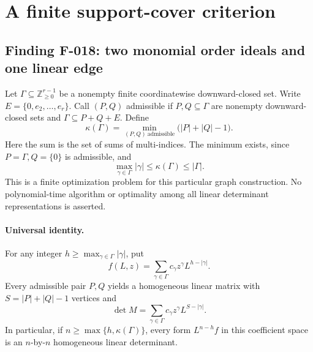 \section{A finite support-cover criterion}

\subsection*{Finding F-018: two monomial order ideals and one linear edge}
Let \(\Gamma\subseteq\mathbb Z_{\geq0}^{r-1}\) be a
nonempty finite coordinatewise downward-closed set. Write
\(E=\{0,e_2,\ldots,e_r\}\). Call \((P,Q)\) admissible
if \(P,Q\subseteq\Gamma\) are nonempty downward-closed
sets and \(\Gamma\subseteq P+Q+E\). Define
\begin{equation}\label{eq:F018kappa}
 \kappa(\Gamma)=\min_{(P,Q)\ \mathrm{admissible}}
                                      \bigl(|P|+|Q|-1\bigr).
\end{equation}
Here the sum is the set of sums of multi-indices. The minimum
exists, since \(P=\Gamma,Q=\{0\}\) is admissible, and
\[
                 \max_{\gamma\in\Gamma}|\gamma|
                         \leq\kappa(\Gamma)\leq|\Gamma|.
\]
This is a finite optimization problem for this particular
graph construction. No polynomial-time algorithm or optimality
among all linear determinant representations is asserted.

\paragraph{Universal identity.}
For any integer \(h\geq\max_{\gamma\in\Gamma}|\gamma|\),
put
\[
               f(L,z)=\sum_{\gamma\in\Gamma}
                         c_\gamma z^\gamma L^{h-|\gamma|}.
\]
Every admissible pair \(P,Q\) yields a homogeneous linear
matrix with \(S=|P|+|Q|-1\) vertices and
\begin{equation}\label{eq:F018det}
                 \det M=\sum_{\gamma\in\Gamma}
                         c_\gamma z^\gamma L^{S-|\gamma|}.
\end{equation}
In particular, if \(n\geq\max\{h,\kappa(\Gamma)\}\),
every form \(L^{n-h}f\) in this coefficient space is an
\(n\)-by-\(n\) homogeneous linear determinant.


